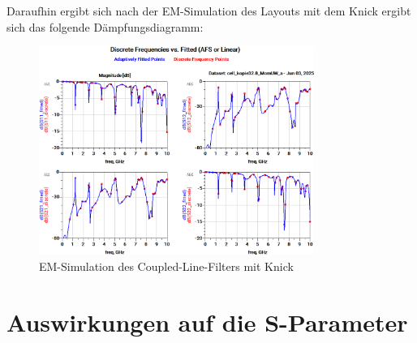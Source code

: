     Daraufhin ergibt sich nach der EM-Simulation des Layouts mit dem Knick ergibt sich das folgende Dämpfungsdiagramm:
    \begin{figure}[H]
        \centering
        \includegraphics[width=0.8\textwidth]{Pictures/EMSimulationmitKnick.png}
        \caption{EM-Simulation des Coupled-Line-Filters mit Knick}
    \end{figure}
\section{Auswirkungen auf die S-Parameter}
